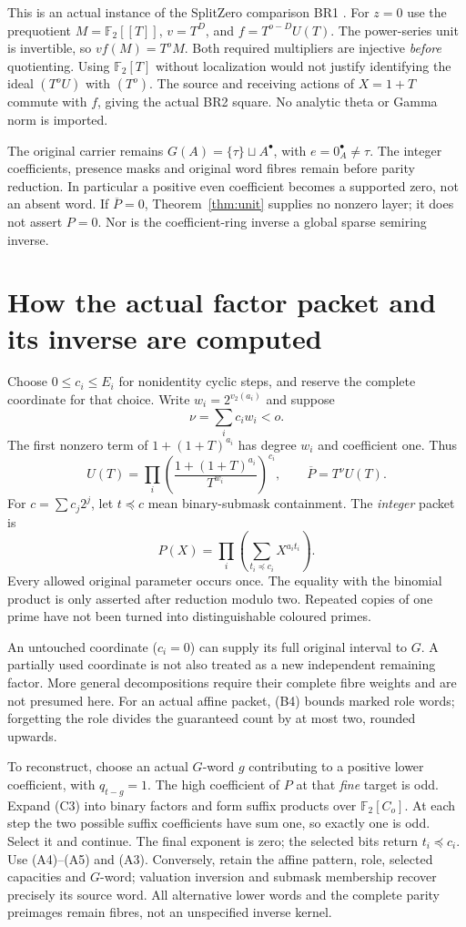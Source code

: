 This is an actual instance of the SplitZero comparison BR1 \cite{SZ}. For $z=0$
use the prequotient $M=\mathbb F_2[[T]]$, $v=T^D$, and
$f=T^{o-D}U(T)$. The power-series unit is invertible, so $vf(M)=T^oM$.
Both required multipliers are injective \emph{before} quotienting. Using
$\mathbb F_2[T]$ without localization would not justify identifying the ideal
$(T^oU)$ with $(T^o)$. The source and receiving actions of $X=1+T$ commute with
$f$, giving the actual BR2 square. No analytic theta or Gamma norm is imported.

The original carrier remains $G(A)=\{\tau\}\sqcup A^\bullet$, with
$e=0_A^\bullet\ne\tau$. The integer coefficients, presence masks and original
word fibres remain before parity reduction. In particular a positive even
coefficient becomes a supported zero, not an absent word. If $\overline P=0$,
Theorem~\ref{thm:unit} supplies no nonzero layer; it does not assert $P=0$.
Nor is the coefficient-ring inverse a global sparse semiring inverse.

\section{How the actual factor packet and its inverse are computed}
Choose $0\le c_i\le E_i$ for nonidentity cyclic steps, and reserve the complete
coordinate for that choice. Write $w_i=2^{v_2(a_i)}$ and suppose
\[
 \nu=\sum_i c_iw_i<o.                                    \tag{C1}
\]
The first nonzero term of $1+(1+T)^{a_i}$ has degree $w_i$ and coefficient
one. Thus
\[
 U(T)=\prod_i\left(\frac{1+(1+T)^{a_i}}{T^{w_i}}\right)^{c_i},
 \qquad \overline P=T^\nu U(T).                           \tag{C2}
\]
For $c=\sum c_j2^j$, let $t\preceq c$ mean binary-submask containment.
The \emph{integer} packet is
\[
 P(X)=\prod_i\left(\sum_{t_i\preceq c_i}X^{a_it_i}\right). \tag{C3}
\]
Every allowed original parameter occurs once. The equality with the binomial
product is only asserted after reduction modulo two. Repeated copies of one
prime have not been turned into distinguishable coloured primes.

An untouched coordinate ($c_i=0$) can supply its full original interval to
$G$. A partially used coordinate is not also treated as a new independent
remaining factor. More general decompositions require their complete fibre
weights and are not presumed here. For an actual affine packet, (B4) bounds
marked role words; forgetting the role divides the guaranteed count by at
most two, rounded upwards.

To reconstruct, choose an actual $G$-word $g$ contributing to a positive lower
coefficient, with $q_{t-g}=1$. The high coefficient of $P$ at that \emph{fine}
target is odd. Expand (C3) into binary factors and form suffix products over
$\mathbb F_2[C_o]$. At each step the two possible suffix coefficients have
sum one, so exactly one is odd. Select it and continue. The final exponent is
zero; the selected bits return $t_i\preceq c_i$. Use (A4)--(A5) and (A3).
Conversely, retain the affine pattern, role, selected capacities and $G$-word;
valuation inversion and submask membership recover precisely its source word.
All alternative lower words and the complete parity preimages remain fibres,
not an unspecified inverse kernel.

